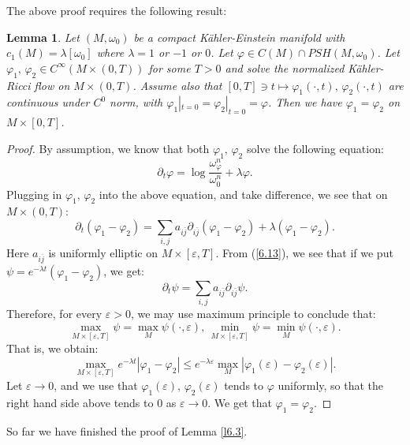 \documentclass[11pt]{amsart}
\newtheorem{lem}{Lemma}[section]
\numberwithin{equation}{section}
\newcommand \eps{\varepsilon}
\begin{document}
The above proof requires the following result:
\begin{lem}
Let $(M,\omega_0)$ be a compact K\"ahler-Einstein manifold with $c_1(M)=\lambda[\omega_0]$ where $\lambda=1$ or $-1$ or $0$.  Let $\varphi\in C(M)\cap PSH(M,\omega_0)$.  Let $\varphi_1,\,\varphi_2\in C^{\infty}(M\times (0,T))$ for some $T>0$ and solve the normalized K\"ahler-Ricci flow on $M\times (0,T)$.  Assume also that $[0,T]\ni t\mapsto \varphi_1(\cdot,t),\,\varphi_2(\cdot,t)$ are continuous under $C^0$ norm,  with $\varphi_1|_{t=0}=\varphi_2|_{t=0}=\varphi$.  Then we have $\varphi_1=\varphi_2$ on $M\times [0,T]$.
\end{lem}
\begin{proof}
By assumption,  we know that both $\varphi_1,\,\varphi_2$ solve the following equation:
\begin{equation*}
\partial_t\varphi=\log\frac{\omega_{\varphi}^n}{\omega_0^n}+\lambda\varphi.
\end{equation*}
Plugging in $\varphi_1,\,\varphi_2$ into the above equation,  and take difference,  we see that on $M\times (0,T)$:
\begin{equation}\label{6.13}
\partial_t(\varphi_1-\varphi_2)=\sum_{i,j}a_{i\bar{j}}\partial_{i\bar{j}}(\varphi_1-\varphi_2)+\lambda(\varphi_1-\varphi_2).
\end{equation}
Here $a_{i\bar{j}}$ is uniformly elliptic on $M\times [\eps,T]$.  From (\ref{6.13}),  we see that if we put $\psi=e^{-\lambda t}(\varphi_1-\varphi_2)$,  we get:
\begin{equation*}
\partial_t\psi=\sum_{i,j}a_{i\bar{j}}\partial_{i\bar{j}}\psi.
\end{equation*}
Therefore,  for every $\eps>0$,  we may use maximum principle to conclude that:
\begin{equation*}
\max_{M\times [\eps,T]}\psi= \max_M\psi(\cdot, \eps),\,\min_{M\times[\eps,T]}\psi=\min_M\psi(\cdot,\eps).
\end{equation*}
That is,  we obtain:
\begin{equation*}
\max_{M\times [\eps,T]}e^{-\lambda t}|\varphi_1-\varphi_2|\le e^{-\lambda \eps}\max_M|\varphi_1(\eps)-\varphi_2(\eps)|.
\end{equation*}
Let $\eps\rightarrow 0$,  and we use that $\varphi_1(\eps),\,\varphi_2(\eps)$ tends to $\varphi$ uniformly,  so that the right hand side above tends to 0 as $\eps\rightarrow 0$.  We get that $\varphi_1=\varphi_2$.
\end{proof}
So far we have finished the proof of Lemma \ref{l6.3}.
\end{document}
